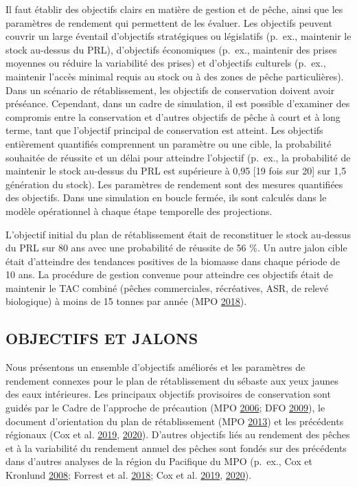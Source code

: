 \documentclass[french,11pt]{book}
\begin{document}
Il faut établir des objectifs clairs en matière de gestion et de pêche, ainsi que les paramètres de rendement qui permettent de les évaluer. Les objectifs peuvent couvrir un large éventail d'objectifs stratégiques ou législatifs (p.~ex., maintenir le stock au-dessus du PRL), d'objectifs économiques (p.~ex., maintenir des prises moyennes ou réduire la variabilité des prises) et d'objectifs culturels (p.~ex., maintenir l'accès minimal requis au stock ou à des zones de pêche particulières). Dans un scénario de rétablissement, les objectifs de conservation doivent avoir préséance. Cependant, dans un cadre de simulation, il est possible d'examiner des compromis entre la conservation et d'autres objectifs de pêche à court et à long terme, tant que l'objectif principal de conservation est atteint. Les objectifs entièrement quantifiés comprennent un paramètre ou une cible, la probabilité souhaitée de réussite et un délai pour atteindre l'objectif (p.~ex., la probabilité de maintenir le stock au-dessus du PRL est supérieure à 0,95 {[}19 fois sur 20{]} sur 1,5 génération du stock). Les paramètres de rendement sont des mesures quantifiées des objectifs. Dans une simulation en boucle fermée, ils sont calculés dans le modèle opérationnel à chaque étape temporelle des projections.

L'objectif initial du plan de rétablissement était de reconstituer le stock au-dessus du PRL sur 80 ans avec une probabilité de réussite de 56 \%. Un autre jalon cible était d'atteindre des tendances positives de la biomasse dans chaque période de 10 ans. La procédure de gestion convenue pour atteindre ces objectifs était de maintenir le TAC combiné (pêches commerciales, récréatives, ASR, de relevé biologique) à moins de 15 tonnes par année (MPO \protect\hyperlink{ref-ifmp2018}{2018}).

\hypertarget{sec:objectives-metrics-obj}{%
\subsection{OBJECTIFS ET JALONS}\label{sec:objectives-metrics-obj}}

Nous présentons un ensemble d'objectifs améliorés et les paramètres de rendement connexes pour le plan de rétablissement du sébaste aux yeux jaunes des eaux intérieures. Les principaux objectifs provisoires de conservation sont guidés par le Cadre de l'approche de précaution (MPO \protect\hyperlink{ref-dfo2006}{2006}; DFO \protect\hyperlink{ref-dfo2009}{2009}), le document d'orientation du plan de rétablissement (MPO \protect\hyperlink{ref-dfo2013}{2013}) et les précédents régionaux (Cox et al. \protect\hyperlink{ref-cox2019}{2019}, \protect\hyperlink{ref-cox2020}{2020}). D'autres objectifs liés au rendement des pêches et à la variabilité du rendement annuel des pêches sont fondés sur des précédents dans d'autres analyses de la région du Pacifique du MPO (p.~ex., Cox et Kronlund \protect\hyperlink{ref-cox2008a}{2008}; Forrest et al. \protect\hyperlink{ref-forrest2018}{2018}; Cox et al. \protect\hyperlink{ref-cox2019}{2019}, \protect\hyperlink{ref-cox2020}{2020}).
\end{document}
